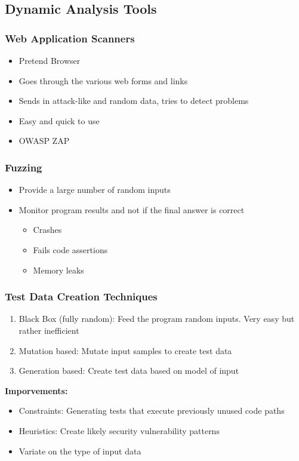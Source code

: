 \subsection{Dynamic Analysis Tools}
\subsubsection{Web Application Scanners}
\begin{itemize}
    \item Pretend Browser
    \item Goes through the various web forms and links
    \item Sends in attack-like and random data, tries to detect problems
    \item Easy and quick to use
    \item OWASP ZAP
\end{itemize}

\subsubsection{Fuzzing}
\begin{itemize}
    \item Provide a large number of random inputs
    \item Monitor program results and not if the final answer is correct
    \begin{itemize}
        \item Crashes
        \item Fails code assertions
        \item Memory leaks
    \end{itemize}
\end{itemize}

\subsubsection{Test Data Creation Techniques}
\begin{enumerate}
    \item Black Box (fully random): Feed the program random inputs. Very easy but rather inefficient
    \item Mutation based: Mutate input samples to create test data
    \item Generation based: Create test data based on model of input
\end{enumerate}
\textbf{Imporvements:}
\begin{itemize}
    \item Constraints: Generating tests that execute previously unused code paths
    \item Heuristics: Create likely security vulnerability patterns
    \item Variate on the type of input data
\end{itemize}

